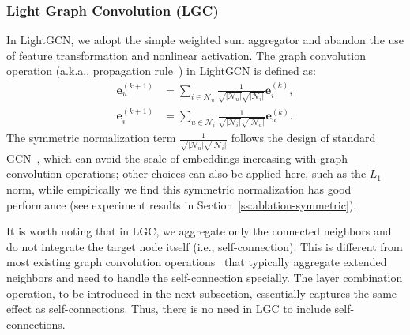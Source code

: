\documentclass[sigconf]{acmart}
\theoremstyle{definition}
\begin{document}
\subsubsection{Light Graph Convolution (LGC)}
In LightGCN, we adopt the simple weighted sum aggregator and abandon the use of feature transformation and nonlinear activation. The graph convolution operation (a.k.a., propagation rule~\cite{NGCF}) in LightGCN is defined as:
\begin{equation}\label{eq:LGC}
\begin{aligned}
    \textbf{e}_{u}^{(k+1)} &= \sum_{i \in \mathcal{N}_u} \frac{1}{\sqrt{|\mathcal{N}_u|}\sqrt{|\mathcal{N}_i|}} \textbf{e}_i^{(k)},  \\
    \textbf{e}_{i}^{(k+1)} &= \sum_{u \in \mathcal{N}_i} \frac{1}{\sqrt{|\mathcal{N}_i|}\sqrt{|\mathcal{N}_u|}} \textbf{e}_u^{(k)}.
\end{aligned}
\end{equation}
The symmetric normalization term $\frac{1}{\sqrt{|\mathcal{N}_u|}\sqrt{|\mathcal{N}_i|}}$ follows the design of standard GCN~\cite{GCN}, which can avoid the scale of embeddings increasing with graph convolution operations; other choices can also be applied here, such as the $L_1$ norm, while empirically we find this symmetric normalization has good performance (see experiment results in Section~\ref{ss:ablation-symmetric}). 

It is worth noting that in LGC, we aggregate only the connected neighbors and do not integrate the target node itself (i.e., self-connection). This is different from most existing graph convolution operations~\cite{NGCF,GCN,GAT,GraphSAGE, BGNN} that typically aggregate extended neighbors and need to handle the self-connection specially. 
The layer combination operation, to be introduced in the next subsection, essentially captures the same effect as self-connections. Thus, there is no need in LGC to include self-connections. 
\end{document}
